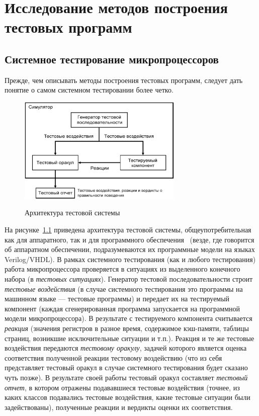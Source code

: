 \chapter{Исследование методов построения тестовых программ}

\section{Системное тестирование микропроцессоров}

Прежде, чем описывать методы построения тестовых программ, следует дать понятие о самом системном тестировании более четко.
\begin{figure}[h] \center
  \includegraphics[width=0.7\textwidth]{1.review/test-system}\\
  \caption{Архитектура тестовой системы}\label{fig:test_system}
\end{figure}

На рисунке~\ref{fig:test_system} приведена архитектура тестовой системы, общеупотребительная как для аппаратного, так и для программного обеспечения~\cite{IvanPreprint} (везде, где говорится об аппаратном обеспечении, подразумеваются их программные модели на языках Verilog/VHDL). В рамках системного тестирования (как и любого тестирования) работа микропроцессора проверяется в ситуациях из выделенного конечного набора (в \emph{тестовых ситуациях}). Генератор тестовой последовательности строит \emph{тестовые воздействия} (в случае системного тестирования это программы на машинном языке --- тестовые программы) и передает их на тестируемый компонент (каждая сгенерированная программа запускается на программной модели микропроцессора). В результате с тестируемого компонента считывается \emph{реакция} (значения регистров в разное время, содержимое кэш-памяти, таблицы страниц, возникшие исключительные ситуации и т.п.). Реакция и те же тестовые воздействия передаются \emph{тестовому оракулу}, задачей которого является оценка соответствия полученной реакции тестовому воздействию (что из себя представляет тестовый оракул в случае системного тестирования будет сказано чуть позже). В результате своей работы тестовый оракул составляет \emph{тестовый отчет}, в котором отражены подававшиеся тестовые воздействия (точнее, из каких классов подавались тестовые воздействия, какие тестовые ситуации были задействованы), полученные реакции и вердикты оценки их соответствия.

